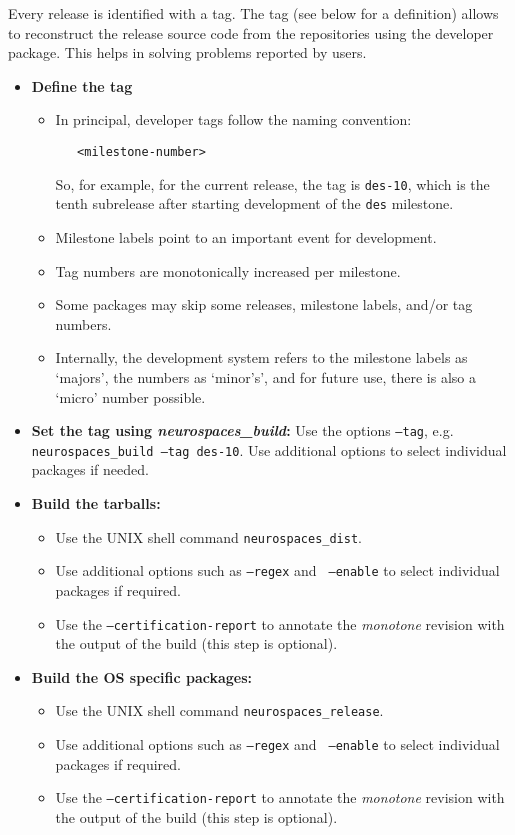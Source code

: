 \documentclass[12pt]{article}
\begin{document}
Every release is identified with a tag.  The tag (see below for a
definition) allows to reconstruct the release source code from the
repositories using the developer package.  This helps in solving
problems reported by users.

\begin{itemize}
\item {\bf Define the tag}
  \begin{itemize}
  \item In principal, developer tags follow the naming convention:
\begin{verbatim}
   <milestone-number>
\end{verbatim}   
    So, for example, for the current release, the tag is {\tt des-10}, which is the tenth subrelease after starting development of the {\tt des} milestone.
  \item Milestone labels point to an important event for development.
  \item Tag numbers are monotonically increased per milestone.
  \item Some packages may skip some releases, milestone labels, and/or tag numbers.
  \item Internally, the development system refers to the milestone labels as `majors', the numbers as `minor's', and for future use, there is also a `micro' number possible.
  \end{itemize}
  
\item {\bf Set the tag using {\it neurospaces\_build}:} Use the options {\tt --tag}, e.g. {\tt neurospaces\_build --tag des-10}. Use additional options to select individual packages if needed.
\item {\bf Build the tarballs:}
  \begin{itemize}
  \item Use the UNIX shell command {\tt neurospaces\_dist}.
  \item Use additional options such as {\tt --regex} and {\tt
      --enable} to select individual packages if required.
  \item Use the {\tt --certification-report} to annotate the {\it
      monotone} revision with the output of the build (this step is
    optional).
  \end{itemize}

\item {\bf Build the OS specific packages:}
  \begin{itemize}
  \item Use the UNIX shell command {\tt neurospaces\_release}.
  \item Use additional options such as {\tt --regex} and {\tt
      --enable} to select individual packages if required.
  \item Use the {\tt --certification-report} to annotate the {\it
      monotone} revision with the output of the build (this step is
    optional).
  \end{itemize}


\end{itemize}
\end{document}
